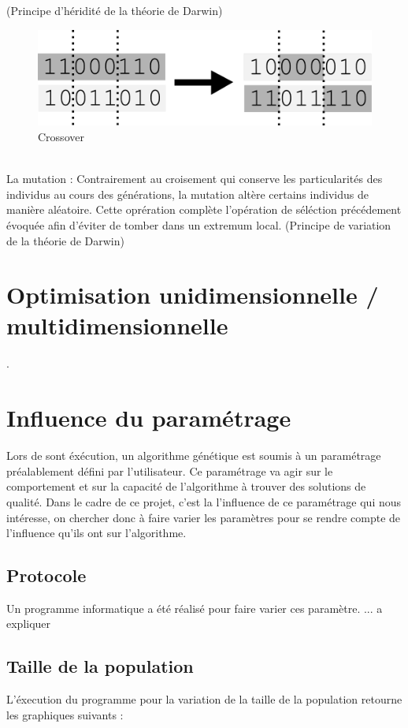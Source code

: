 \documentclass[12pt]{report}
\begin{document}
        (Principe d'héridité de la théorie de Darwin)
        \begin{figure}
          \centering
          \includegraphics{img/crossover.png}
          \caption{Crossover}
        \end{figure}
        \\
        La mutation :
        Contrairement au croisement qui conserve les particularités des individus au cours des générations, la mutation altère certains individus de manière aléatoire. Cette oprération complète l'opération de séléction précédement évoquée afin d'éviter de tomber dans un extremum local.
        (Principe de variation de la théorie de Darwin)



    \section{Optimisation unidimensionnelle / multidimensionnelle}.

    \section{Influence du paramétrage }
      Lors de sont éxécution, un algorithme génétique est soumis à un paramétrage préalablement défini par l'utilisateur. Ce paramétrage va agir sur le comportement et sur la capacité de l'algorithme à trouver des solutions de qualité. Dans le cadre de ce projet, c'est la l'influence de ce paramétrage qui nous intéresse, on chercher donc à faire varier les paramètres pour se rendre compte de l'influence qu'ils ont sur l'algorithme.

      \subsection{Protocole}
        Un programme informatique a été réalisé pour faire varier ces paramètre.
        ... a expliquer



      \subsection{Taille de la population}
        L'éxecution du programme pour la variation de la taille de la population retourne les graphiques suivants :
\end{document}

